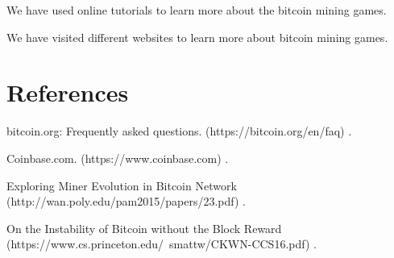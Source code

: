 \documentclass{article}
\begin{document}
We have used online tutorials to learn more about the bitcoin mining games.

We have visited different websites to learn more about bitcoin mining games.

\section{References}
bitcoin.org: Frequently asked questions. (https://bitcoin.org/en/faq) .

Coinbase.com. (https://www.coinbase.com) .

Exploring Miner Evolution in Bitcoin Network (http://wan.poly.edu/pam2015/papers/23.pdf) .

On the Instability of Bitcoin without the Block Reward (https://www.cs.princeton.edu/~smattw/CKWN-CCS16.pdf) .
\end{document}
